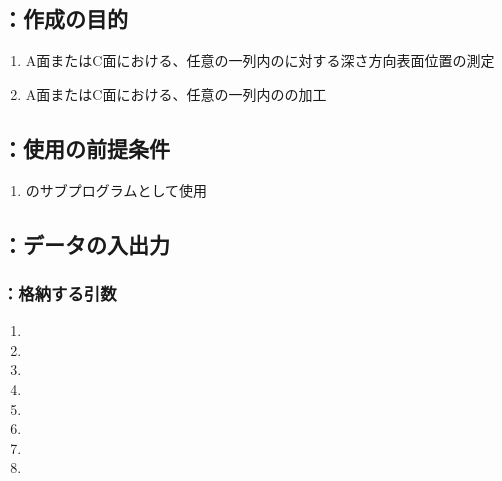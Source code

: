 \subsection{\DLtwoAC：作成の目的}
\begin{enumerate}[label*=\sarrow]
\item A面またはC面における、任意の一列内の\Dimple に対する深さ方向表面位置の測定
\item A面またはC面における、任意の一列内の\Dimple の加工
\end{enumerate}


\subsection{\DLtwoAC：使用の前提条件}
\begin{enumerate}[label*=\sarrow]
\item \DLone のサブプログラムとして使用
\end{enumerate}


\subsection{\DLtwoAC：データの入出力}

\subsubsection{\DLtwoAC：格納する引数}
\begin{enumerate}[label*=\sarrow]
\item \PMACFaceSelectionFlag
\item \PMDimpleAngle
\item \PMDimpleHorizontalPitch
\item \PMDimpleOddRowLength
\item \PMDimpleEvenRowLength
\item \PMDimpleRowNum
\item \PMDimpleDepth
\item \PMTopEndACIDMeasuredValue
\end{enumerate}


